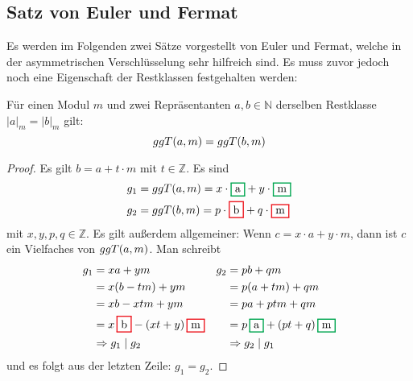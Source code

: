 \subsection{Satz von Euler und Fermat}
Es werden im Folgenden zwei Sätze vorgestellt von Euler und Fermat, welche
in der asymmetrischen Verschlüsselung sehr hilfreich sind. Es muss zuvor jedoch noch eine
Eigenschaft der Restklassen festgehalten werden:

\begin{satz}
  \label{satz:restklasse-ggt}
  Für einen Modul $m$ und zwei Repräsentanten $a,b \in \mathbb{N}$ derselben
  Restklasse $\vert a \vert_m = \vert b \vert_m$ gilt:
  \begin{equation*}
    ggT(a,m) = ggT(b,m)
  \end{equation*}
\end{satz}
\begin{proof}
  Es gilt $b = a + t \cdot m$ mit $t \in \mathbb{Z}$. Es sind
  \begin{align*}
    g_1 & = \ggt{a}{m} = x \cdot \hl{Green}{a} + y \cdot \hl{Green}{m} \\
    g_2 & = \ggt{b}{m} = p \cdot \hl{Red}{b} + q \cdot \hl{Red}{m}
  \end{align*}
  mit $x,y,p,q \in \mathbb{Z}$. Es gilt außerdem allgemeiner: Wenn $c = x \cdot a + y \cdot m$,
  dann ist $c$ ein Vielfaches von $ggT(a,m)$.
  Man schreibt
  \begin{align*}
    g_1 & = xa + ym                                & g_2 & = pb + qm                                    \\
        & = x(b - tm) + ym                         &     & = p(a + tm) + qm                             \\
        & = xb - xtm + ym                          &     & = pa + ptm + qm                              \\
        & = x\,\hl{Red}{b} - (xt + y)\,\hl{Red}{m} &     & = p\,\hl{Green}{a} + (pt + q)\,\hl{Green}{m} \\
        & \Rightarrow g_1 \mid g_2                 &     & \Rightarrow g_2 \mid g_1
  \end{align*}
  und es folgt aus der letzten Zeile: $g_1 = g_2$.
\end{proof}


